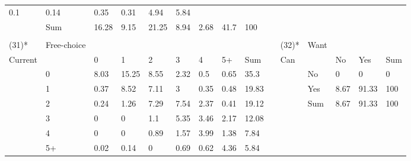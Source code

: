 \begin{center}
\begin{landscape}
\begin{longtable}{lllllllllllllll}
  \cellcolor[HTML]{FFFFFF}0.1 &
  \cellcolor[HTML]{FFFFFF}0.14 &
  \cellcolor[HTML]{FEFEFE}0.35 &
  \cellcolor[HTML]{FEFEFE}0.31 &
  \cellcolor[HTML]{E4E4E4}4.94 &
  5.84 &
   &
   &
   &
   &
   &
    \\
  &
  Sum &
  16.28 &
  9.15 &
  21.25 &
  8.94 &
  2.68 &
  41.7 &
  100 &
    &
    &
    &
    &
    &
    \\
  &
    &
    &
    &
    &
    &
    &
    &
    &
    &
    &
    &
    &
    &
    \\
(31)* &
  Free-choice &
   &
   &
   &
   &
   &
   &
    &
   &
  (32)* &
  Want &
   &
   &
    \\
Current &
   &
  0 &
  1 &
  2 &
  3 &
  4 &
  5+ &
  Sum &
    &
  Can &
   &
  No &
  Yes &
  Sum \\
 &
  0 &
  \cellcolor[HTML]{D1D1D1}8.03 &
  \cellcolor[HTML]{A6A6A6}15.25 &
  \cellcolor[HTML]{CECECE}8.55 &
  \cellcolor[HTML]{F2F2F2}2.32 &
  \cellcolor[HTML]{FDFDFD}0.5 &
  \cellcolor[HTML]{FCFCFC}0.65 &
  35.3 &
   &
   &
  No &
  \cellcolor[HTML]{FFFFFF}0 &
  \cellcolor[HTML]{FFFFFF}0 &
  0 \\
 &
  1 &
  \cellcolor[HTML]{FDFDFD}0.37 &
  \cellcolor[HTML]{CECECE}8.52 &
  \cellcolor[HTML]{D6D6D6}7.11 &
  \cellcolor[HTML]{EEEEEE}3 &
  \cellcolor[HTML]{FDFDFD}0.35 &
  \cellcolor[HTML]{FDFDFD}0.48 &
  19.83 &
   &
   &
  Yes &
  \cellcolor[HTML]{F7F7F7}8.67 &
  \cellcolor[HTML]{A6A6A6}91.33 &
  100 \\
 &
  2 &
  \cellcolor[HTML]{FEFEFE}0.24 &
  \cellcolor[HTML]{F8F8F8}1.26 &
  \cellcolor[HTML]{D5D5D5}7.29 &
  \cellcolor[HTML]{D3D3D3}7.54 &
  \cellcolor[HTML]{F2F2F2}2.37 &
  \cellcolor[HTML]{FDFDFD}0.41 &
  19.12 &
   &
   &
  Sum &
  8.67 &
  91.33 &
  100 \\
 &
  3 &
  \cellcolor[HTML]{FFFFFF}0 &
  \cellcolor[HTML]{FFFFFF}0 &
  \cellcolor[HTML]{F9F9F9}1.1 &
  \cellcolor[HTML]{E0E0E0}5.35 &
  \cellcolor[HTML]{EBEBEB}3.46 &
  \cellcolor[HTML]{F3F3F3}2.17 &
  12.08 &
   &
   &
   &
   &
   &
    \\
 &
  4 &
  \cellcolor[HTML]{FFFFFF}0 &
  \cellcolor[HTML]{FFFFFF}0 &
  \cellcolor[HTML]{FAFAFA}0.89 &
  \cellcolor[HTML]{F6F6F6}1.57 &
  \cellcolor[HTML]{E8E8E8}3.99 &
  \cellcolor[HTML]{F7F7F7}1.38 &
  7.84 &
   &
   &
   &
   &
   &
    \\
 &
  5+ &
  \cellcolor[HTML]{FFFFFF}0.02 &
  \cellcolor[HTML]{FFFFFF}0.14 &
  \cellcolor[HTML]{FFFFFF}0 &
  \cellcolor[HTML]{FBFBFB}0.69 &
  \cellcolor[HTML]{FCFCFC}0.62 &
  \cellcolor[HTML]{E6E6E6}4.36 &
  5.84 &
   &
   &
   &
   &

\end{longtable}
\end{landscape}
\end{center}
